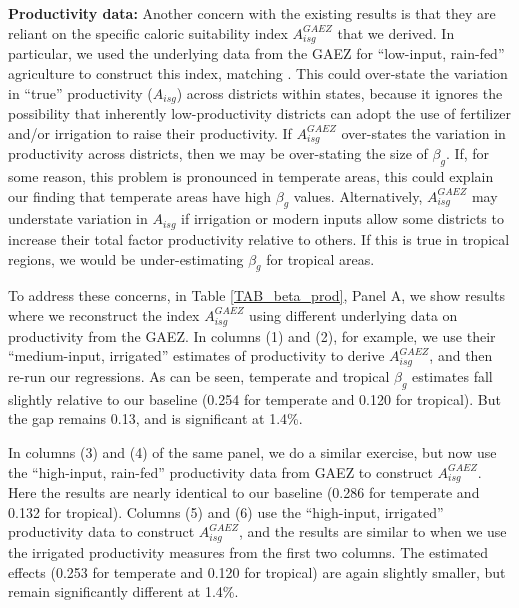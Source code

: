 \documentclass[11pt]{article}
\begin{document}
\vspace{.5cm}\noindent\textbf{Productivity data:} Another concern with the existing results is that they are reliant on the specific caloric suitability index $A_{isg}^{GAEZ}$ that we derived. In particular, we used the underlying data from the GAEZ for ``low-input, rain-fed'' agriculture to construct this index, matching \cite{galorozak2016}. This could over-state the variation in ``true'' productivity ($A_{isg}$) across districts within states, because it ignores the possibility that inherently low-productivity districts can adopt the use of fertilizer and/or irrigation to raise their productivity. If $A_{isg}^{GAEZ}$ over-states the variation in productivity across districts, then we may be over-stating the size of $\beta_g$. If, for some reason, this problem is pronounced in temperate areas, this could explain our finding that temperate areas have high $\beta_g$ values. Alternatively, $A_{isg}^{GAEZ}$ may understate variation in $A_{isg}$ if irrigation or modern inputs allow some districts to increase their total factor productivity relative to others. If this is true in tropical regions, we would be under-estimating $\beta_g$ for tropical areas.

To address these concerns, in Table \ref{TAB_beta_prod}, Panel A, we show results where we reconstruct the index $A_{isg}^{GAEZ}$ using different underlying data on productivity from the GAEZ. In columns (1) and (2), for example, we use their ``medium-input, irrigated'' estimates of productivity to derive $A_{isg}^{GAEZ}$, and then re-run our regressions. As can be seen, temperate and tropical $\beta_g$ estimates fall slightly relative to our baseline (0.254 for temperate and 0.120 for tropical). But the gap remains 0.13, and is significant at 1.4\%.

In columns (3) and (4) of the same panel, we do a similar exercise, but now use the ``high-input, rain-fed'' productivity data from GAEZ to construct $A_{isg}^{GAEZ}$. Here the results are nearly identical to our baseline (0.286 for temperate and 0.132 for tropical). Columns (5) and (6) use the ``high-input, irrigated'' productivity data to construct $A_{isg}^{GAEZ}$, and the results are similar to when we use the irrigated productivity measures from the first two columns. The estimated effects (0.253 for temperate and 0.120 for tropical) are again slightly smaller, but remain significantly different at 1.4\%.
\end{document}
